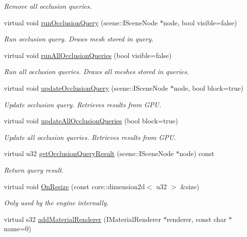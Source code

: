 \begin{DoxyCompactItemize}
\begin{DoxyCompactList}\small\item\em Remove all occlusion queries. \end{DoxyCompactList}\item 
virtual void \hyperlink{classirr_1_1video_1_1_c_null_driver_a7ac197f35195587b290756d61595cd15}{run\-Occlusion\-Query} (scene\-::\-I\-Scene\-Node $\ast$node, bool visible=false)
\begin{DoxyCompactList}\small\item\em Run occlusion query. Draws mesh stored in query. \end{DoxyCompactList}\item 
virtual void \hyperlink{classirr_1_1video_1_1_c_null_driver_a2db2ea0c8931cf3b95a2a8bf41017cb1}{run\-All\-Occlusion\-Queries} (bool visible=false)
\begin{DoxyCompactList}\small\item\em Run all occlusion queries. Draws all meshes stored in queries. \end{DoxyCompactList}\item 
virtual void \hyperlink{classirr_1_1video_1_1_c_null_driver_a0421f9e8dcc3c1d7bbf47f957bb9b33c}{update\-Occlusion\-Query} (scene\-::\-I\-Scene\-Node $\ast$node, bool block=true)
\begin{DoxyCompactList}\small\item\em Update occlusion query. Retrieves results from G\-P\-U. \end{DoxyCompactList}\item 
virtual void \hyperlink{classirr_1_1video_1_1_c_null_driver_a012fd1d28e32b94ef48e21d9d50aa899}{update\-All\-Occlusion\-Queries} (bool block=true)
\begin{DoxyCompactList}\small\item\em Update all occlusion queries. Retrieves results from G\-P\-U. \end{DoxyCompactList}\item 
virtual u32 \hyperlink{classirr_1_1video_1_1_c_null_driver_a10a2bdf85393f6caa0cb1a09f03968a6}{get\-Occlusion\-Query\-Result} (scene\-::\-I\-Scene\-Node $\ast$node) const 
\begin{DoxyCompactList}\small\item\em Return query result. \end{DoxyCompactList}\item 
virtual void \hyperlink{classirr_1_1video_1_1_c_null_driver_ae1aac99888a5b15573af57b0b01d1bed}{On\-Resize} (const core\-::dimension2d$<$ u32 $>$ \&size)
\begin{DoxyCompactList}\small\item\em Only used by the engine internally. \end{DoxyCompactList}\item 
\hypertarget{classirr_1_1video_1_1_c_null_driver_a48b0726d1f1db60a8ad3dffc3d7a2327}{virtual s32 \hyperlink{classirr_1_1video_1_1_c_null_driver_a48b0726d1f1db60a8ad3dffc3d7a2327}{add\-Material\-Renderer} (I\-Material\-Renderer $\ast$renderer, const char $\ast$name=0)}\label{classirr_1_1video_1_1_c_null_driver_a48b0726d1f1db60a8ad3dffc3d7a2327}


\end{DoxyCompactItemize}
